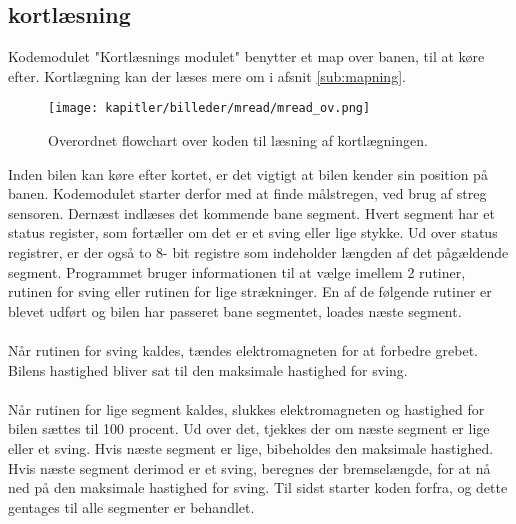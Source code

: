 \newpage

\subsection{kortlæsning}

Kodemodulet "Kortlæsnings modulet" benytter et map over banen, til at køre efter. Kortlægning kan der læses mere om i afsnit \ref{sub:mapning}.

\begin{figure}[ht]
\centering
\texttt{[image: kapitler/billeder/mread/mread\_ov.png]}
\caption{Overordnet flowchart over koden til læsning af kortlægningen.}
\label{fig:mread}
\end{figure}

Inden bilen kan køre efter kortet, er det vigtigt at bilen kender sin position på banen. Kodemodulet starter derfor med at finde målstregen, ved brug af streg sensoren. Dernæst indlæses det kommende bane segment. Hvert segment har et status register, som fortæller om det er et sving eller lige stykke. Ud over status registrer, er der også to 8- bit registre som indeholder længden af det pågældende segment. Programmet bruger informationen til at vælge imellem 2 rutiner, rutinen for sving eller rutinen for lige strækninger. En af de følgende rutiner er blevet udført og bilen har passeret bane segmentet, loades næste segment.\\
\\
Når rutinen for sving kaldes, tændes elektromagneten for at forbedre grebet. Bilens hastighed bliver sat til den maksimale hastighed for sving.\\
\\
Når rutinen for lige segment kaldes, slukkes elektromagneten og hastighed for bilen sættes til 100 procent. Ud over det, tjekkes der om næste segment er lige eller et sving. Hvis næste segment er lige, bibeholdes den maksimale hastighed. Hvis næste segment derimod er et sving, beregnes der bremselængde, for at nå ned på den maksimale hastighed for sving. Til sidst starter koden forfra, og dette gentages til alle segmenter er behandlet.
